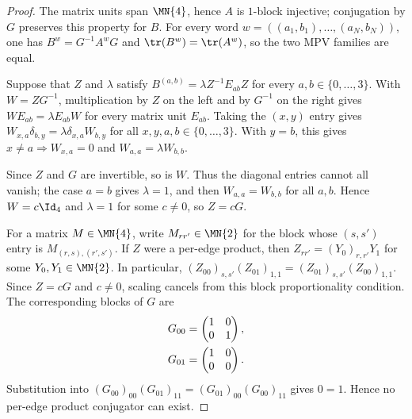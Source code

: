 \begin{proof}
    \leanok
    The matrix units span $\MN{4}$, hence $A$ is $1$-block injective; conjugation
    by $G$ preserves this property for $B$. For every word
    $w=((a_1,b_1),\ldots,(a_N,b_N))$, one has
    $B^w=G^{-1}A^wG$ and $\tr(B^w)=\tr(A^w)$, so the two MPV families are
    equal.

    Suppose that $Z$ and $\lambda$ satisfy
    $B^{(a,b)}=\lambda Z^{-1}E_{ab}Z$ for every $a,b\in\{0,\ldots,3\}$.
    With $W=ZG^{-1}$, multiplication by $Z$ on the left and by $G^{-1}$
    on the right gives $WE_{ab}=\lambda E_{ab}W$ for every matrix unit
    $E_{ab}$. Taking the $(x,y)$ entry gives
    $W_{x,a}\delta_{b,y}=\lambda\delta_{x,a}W_{b,y}$ for all
    $x,y,a,b\in\{0,\ldots,3\}$. With $y=b$, this gives
    $x\ne a\Rightarrow W_{x,a}=0$ and
    $W_{a,a}=\lambda W_{b,b}$.

    Since $Z$ and $G$ are invertible, so is $W$. Thus the diagonal entries
    cannot all vanish; the case $a=b$ gives $\lambda=1$, and then
    $W_{a,a}=W_{b,b}$ for all $a,b$. Hence $W=c\Id_4$ and $\lambda=1$ for
    some $c\ne0$, so $Z=cG$.

    For a matrix $M\in\MN{4}$, write $M_{rr'}\in\MN{2}$ for the block
    whose $(s,s')$ entry is $M_{(r,s),(r',s')}$. If $Z$ were a per-edge
    product, then $Z_{rr'}=(Y_0)_{r,r'}Y_1$ for some
    $Y_0,Y_1\in\MN{2}$. In particular,
    $(Z_{00})_{s,s'}(Z_{01})_{1,1}
        =(Z_{01})_{s,s'}(Z_{00})_{1,1}$.
    Since $Z=cG$ and $c\ne0$, scaling cancels from this block
    proportionality condition. The corresponding blocks of $G$ are
    \begin{align}
        G_{00}
         & =
        \begin{pmatrix}
            1 & 0 \\
            0 & 1
        \end{pmatrix}, \notag \\
        G_{01}
         & =
        \begin{pmatrix}
            1 & 0 \\
            0 & 0
        \end{pmatrix}.
        \notag
    \end{align}
    Substitution into
    $(G_{00})_{00}(G_{01})_{11}
        =(G_{01})_{00}(G_{00})_{11}$ gives $0=1$. Hence no per-edge product
    conjugator can exist.
\end{proof}
